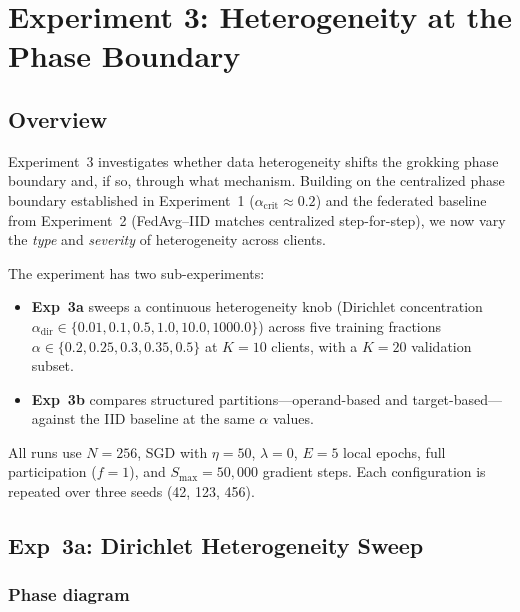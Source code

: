 \section{Experiment 3: Heterogeneity at the Phase Boundary}
\label{sec:exp3}

\subsection{Overview}

Experiment~3 investigates whether data heterogeneity shifts the grokking phase
boundary and, if so, through what mechanism.  Building on the centralized phase
boundary established in Experiment~1 ($\alpha_{\mathrm{crit}} \approx 0.2$) and
the federated baseline from Experiment~2 (FedAvg--IID matches centralized
step-for-step), we now vary the \emph{type} and \emph{severity} of
heterogeneity across clients.

The experiment has two sub-experiments:
\begin{itemize}
  \item \textbf{Exp~3a} sweeps a continuous heterogeneity knob (Dirichlet
        concentration $\alpha_{\mathrm{dir}} \in \{0.01, 0.1, 0.5, 1.0, 10.0,
        1000.0\}$) across five training fractions
        $\alpha \in \{0.2, 0.25, 0.3, 0.35, 0.5\}$ at $K{=}10$ clients, with a
        $K{=}20$ validation subset.
  \item \textbf{Exp~3b} compares structured partitions---operand-based and
        target-based---against the IID baseline at the same $\alpha$ values.
\end{itemize}
All runs use $N{=}256$, SGD with $\eta{=}50$, $\lambda{=}0$, $E{=}5$ local
epochs, full participation ($f{=}1$), and $S_{\max}{=}50{,}000$ gradient steps.
Each configuration is repeated over three seeds (42, 123, 456).


\subsection{Exp~3a: Dirichlet Heterogeneity Sweep}
\label{sec:exp3a}

\subsubsection{Phase diagram}


